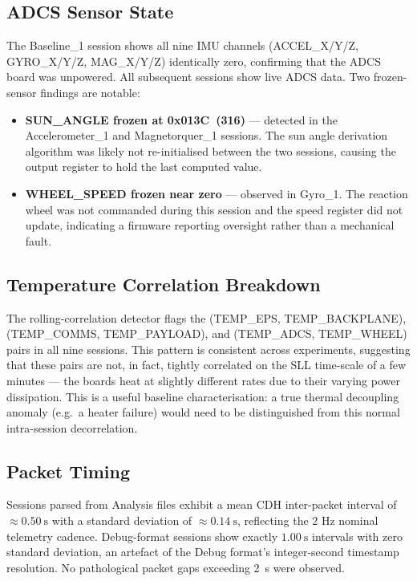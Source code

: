 \documentclass[conference]{IEEEtran}
\begin{document}
\subsection{ADCS Sensor State}

The Baseline\_1 session shows all nine IMU channels
(ACCEL\_X/Y/Z, GYRO\_X/Y/Z, MAG\_X/Y/Z) identically zero,
confirming that the ADCS board was unpowered.  All subsequent
sessions show live ADCS data.  Two frozen-sensor findings are
notable:

\begin{itemize}
  \item \textbf{SUN\_ANGLE frozen at 0x013C~(316)} — detected in the
        Accelerometer\_1 and Magnetorquer\_1 sessions.  The sun angle
        derivation algorithm was likely not re-initialised between the
        two sessions, causing the output register to hold the last
        computed value.
  \item \textbf{WHEEL\_SPEED frozen near zero} — observed in Gyro\_1.
        The reaction wheel was not commanded during this session and
        the speed register did not update, indicating a firmware
        reporting oversight rather than a mechanical fault.
\end{itemize}

\subsection{Temperature Correlation Breakdown}

The rolling-correlation detector flags the
(TEMP\_EPS, TEMP\_BACKPLANE), (TEMP\_COMMS, TEMP\_PAYLOAD), and
(TEMP\_ADCS, TEMP\_WHEEL) pairs in all nine sessions.  This pattern
is consistent across experiments, suggesting that these pairs are
not, in fact, tightly correlated on the SLL time-scale of a few
minutes — the boards heat at slightly different rates due to their
varying power dissipation.  This is a useful baseline characterisation:
a true thermal decoupling anomaly (e.g.\ a heater failure) would need
to be distinguished from this normal intra-session decorrelation.

\subsection{Packet Timing}

Sessions parsed from Analysis files exhibit a mean CDH inter-packet
interval of $\approx \SI{0.50}{\second}$ with a standard deviation of
$\approx \SI{0.14}{\second}$, reflecting the 2 Hz nominal telemetry
cadence.  Debug-format sessions show exactly $\SI{1.00}{\second}$
intervals with zero standard deviation, an artefact of the Debug
format's integer-second timestamp resolution.  No pathological packet
gaps exceeding \SI{2}{\second} were observed.
\end{document}
